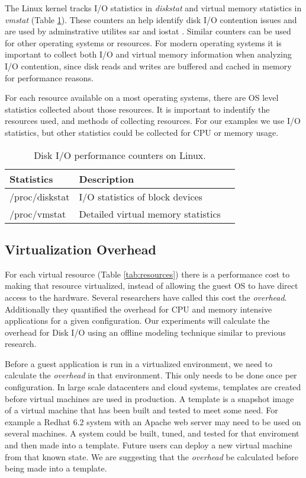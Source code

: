 \indent The Linux kernel tracks I/O statistics in \emph{diskstat} and virtual memory statistics in \emph{vmstat} (Table \ref{tab:iocounters}).  
These counters an help identify disk I/O contention issues and are used by adminstrative utilites sar and iostat \cite{iostats}.  
Similar counters can be used for other operating systems or resources. 
For modern operating systems it is important to collect both I/O and virtual memory information when analyzing I/O contention, since disk reads and writes are buffered and cached in memory for performance reasons. 

\indent For each resource available on a most operating systems, there are OS level statistics collected about those resources.  It is important to indentify the resources used, and methods of collecting resources.  
For our examples we use I/O statistics, but other statistics could be collected for CPU or memory usage.

\begin{table}
\begin{tabular}{ l l p{5cm} }
  Statistics & Description \\
  \hline
  /proc/diskstat & I/O statistics of block devices \\
  /proc/vmstat & Detailed virtual memory statistics\\
  \hline
\end{tabular}
\caption{Disk I/O performance counters on Linux.}
\label{tab:iocounters}
\end{table}


\subsection{Virtualization Overhead}
For each virtual resource (Table \ref{tab:resources}) there is a performance cost to making that resource virtualized, instead of allowing the guest OS to have direct access to the hardware.  
Several researchers \cite{cherkasova, huber1} have called this cost the \emph{overhead}.  
Additionally they quantified the overhead for CPU and memory intensive applications for a given configuration.  Our experiments will calculate the overhead for Disk I/O using an offline modeling technique similar to previous research.

\indent Before a guest application is run in a virtualized environment, we need to calculate the \emph{overhead} in that environment.  This only needs to be done once per configuration.  In large scale datacenters and cloud systems, templates are created before virtual machines are used in production.  A template is a snapshot image of a virtual machine that has been built and tested to meet some need.  For example a Redhat 6.2 system with an Apache web server may need to be used on several machines.  A system could be built, tuned, and tested for that enviroment and then made into a template.  Future users can deploy a new virtual machine from that known state.  We are suggesting that the \emph{overhead} be calculated before being made into a template.  

